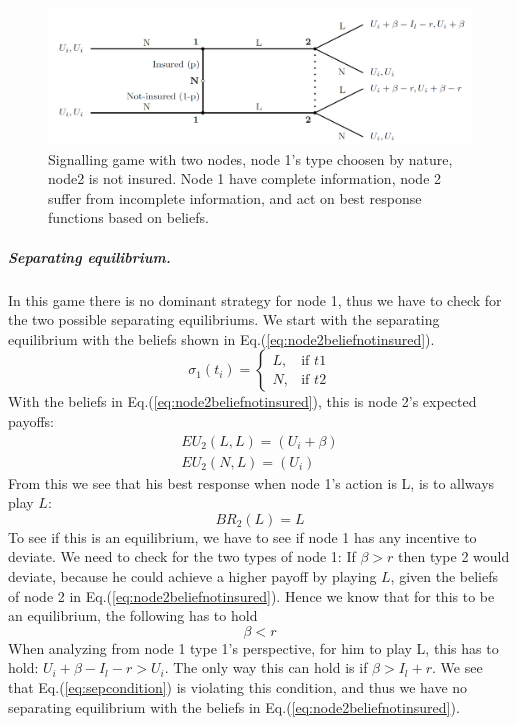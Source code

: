 \begin{figure}[h]
\centering

  \centering
\includegraphics[width=1\linewidth]{../Figures/SignalingGameNotInsured.png}

\caption[Leader/Follower game, node 1's type is chosen by nature, and node 2 is not insured]{Signalling game with two nodes, node 1's type choosen by nature, node2 is not insured. Node 1 have complete information, node 2 suffer from incomplete information, and act on best response functions based on beliefs. \label{fig:signalingNotInsured}}

\end{figure}
\subparagraph{Separating equilibrium.}
In this game there is no dominant strategy for node 1, thus we have to check for the two possible separating equilibriums.
We start with the separating equilibrium with the beliefs shown in Eq.(\ref{eq:node2beliefnotinsured}).
\begin{equation}
    \sigma_{1}(t_{i})= 
\begin{cases}
   L,& \text{if } t1\\
   N,& \text{if } t2  
\end{cases}
\label{eq:node2beliefnotinsured}
\end{equation}
With the beliefs in Eq.(\ref{eq:node2beliefnotinsured}), this is node 2's expected payoffs:
\begin{eqnarray}
EU_{2}(L,L)=(U_{i}+\beta) \\
EU_{2}(N,L)=(U_{i})
\end{eqnarray}
From this we see that his best response when node 1's action is L, is to allways play $L$: \begin{equation}
BR_{2}(L)= L
\end{equation}
To see if this is an equilibrium, we have to see if node 1 has any incentive to deviate. 
We need to check for the two types of node 1:
If $\beta>r$ then type 2 would deviate, because he could achieve a higher payoff by playing $L$, given the beliefs of node 2 in Eq.(\ref{eq:node2beliefnotinsured}). Hence we know that for this to be an equilibrium, the following has to hold
\begin{equation}
\beta < r
\label{eq:sepcondition}
\end{equation}  
When analyzing from node 1 type 1's perspective, for him to play L, this has to hold: $U_{i}+\beta-I_{l}-r > U_{i}$. The only way this can hold is if $\beta>I_{l}+r$. We see that Eq.(\ref{eq:sepcondition}) is violating this condition, and thus we have no separating equilibrium with the beliefs in Eq.(\ref{eq:node2beliefnotinsured}).

